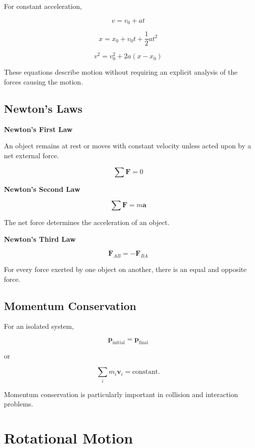 \documentclass[11pt,a4paper]{article}
\begin{document}
For constant acceleration,

\[
v=v_0+at
\]

\[
x=x_0+v_0t+\frac{1}{2}at^2
\]

\[
v^2=v_0^2+2a(x-x_0)
\]

These equations describe motion without requiring an explicit analysis of the forces causing the motion.

\subsection{Newton's Laws}

\textbf{Newton's First Law}

An object remains at rest or moves with constant velocity unless acted upon by a net external force.

\[
\sum \bm{F}=0
\]

\textbf{Newton's Second Law}

\[
\sum \bm{F}=m\bm{a}
\]

The net force determines the acceleration of an object.

\textbf{Newton's Third Law}

\[
\bm{F}_{AB}=-\bm{F}_{BA}
\]

For every force exerted by one object on another, there is an equal and opposite force.

\subsection{Momentum Conservation}

For an isolated system,

\[
\bm{p}_{\mathrm{initial}}
=
\bm{p}_{\mathrm{final}}
\]

or

\[
\sum_i m_i\bm{v}_i
=
\text{constant}.
\]

Momentum conservation is particularly important in collision and interaction problems.

\section{Rotational Motion}
\end{document}
